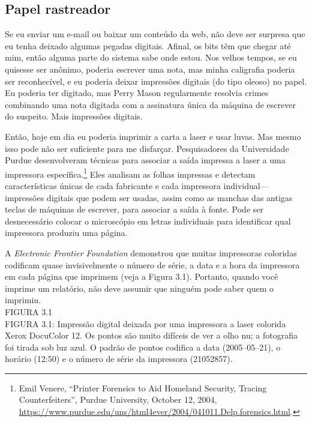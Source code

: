 \documentclass{book}
\newcommand{\ingles}[1]{\textit{#1}}
\begin{document}
\subsection{Papel rastreador}
\label{cap3:quem-pegadas-papel}
Se eu enviar um e-mail ou baixar um conteúdo da web, não deve ser surpresa que eu
tenha deixado algumas pegadas digitais. Afinal, os bits têm que chegar até mim,
então alguma parte do sistema sabe onde estou. Nos velhos tempos, se eu quisesse
ser anônimo, poderia escrever uma nota, mas minha caligrafia poderia ser reconhecível,
e eu poderia deixar impressões digitais (do tipo oleoso) no papel. Eu poderia ter
digitado, mas Perry Mason regularmente resolvia crimes combinando uma nota digitada
com a assinatura única da máquina de escrever do suspeito. Mais impressões digitais.

Então, hoje em dia eu poderia imprimir a carta a laser e usar luvas. Mas mesmo
isso pode não ser suficiente para me disfarçar. Pesquisadores da Universidade
Purdue desenvolveram técnicas para associar a saída impressa a laser a uma
impressora específica.\footnote{Emil Venere, ``Printer Forensics to Aid
Homeland Security, Tracing Counterfeiters'', Purdue University, October 12,
2004,
\url{https://www.purdue.edu/uns/html4ever/2004/041011.Delp.forensics.html}.}
Eles analisam as folhas impressas e detectam características únicas de cada
fabricante e cada impressora individual---impressões digitais que podem ser
usadas, assim como as manchas das antigas teclas de máquinas de escrever, para
associar a saída à fonte. Pode ser desnecessário colocar o microscópio em
letras individuais para identificar qual impressora produziu uma página.

A \ingles{Electronic Frontier Foundation} demonstrou que muitas impressoras
coloridas codificam quase invisivelmente o número de série, a data e a hora da
impressora em cada página que imprimem (veja a Figura 3.1). Portanto, quando
você imprime um relatório, não deve assumir que ninguém pode saber quem o
imprimiu.\\

FIGURA 3.1\\

FIGURA 3.1: Impressão digital deixada por uma impressora a laser colorida Xerox
DocuColor 12. Os pontos são muito difíceis de ver a olho nu; a fotografia foi
tirada sob luz azul. O padrão de pontos codifica a data (2005--05--21), o
horário (12:50) e o número de série da impressora (21052857).
\end{document}
